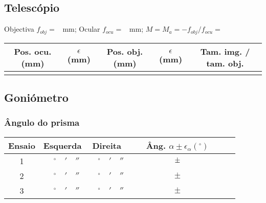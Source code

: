 \documentclass[a4paper,12pt]{article}  %
\begin{document}

\newpage
\subsection{\sf Telescópio}


Objectiva $f_{obj}=$~\underline{\makebox[1cm][r]{~}} mm;
Ocular $f_{ocu}=$~\underline{\makebox[1cm][r]{~}} mm; 
$M=M_a=-f_{obj}/f_{ocu}=$~\underline{\makebox[1cm][r]{~}} 

\begin{center}
	\begin{tabular}{|c|c|c|c|c|}
	\hline
	 Pos. ocu. (mm)   &  
	 $\epsilon$  (mm) & 
	 Pos. obj. (mm) &  
	 $\epsilon$ (mm) &
	 Tam. img. / tam. obj. \\
	 
	\hline \hline
	 &  &  & & \makebox[1cm][r]{} \\ \hline
	\end{tabular}
\end{center}


\vspace{1 cm}

\subsection{\sf Goniómetro}

\subsubsection{\sf Ângulo do prisma}

\begin{center}
	\begin{tabular}{|c|c|c|c||c|}
	\hline
	Ensaio &
	 Esquerda    &  
	 Direita & 
	 Âng. $\alpha\pm\epsilon_{\alpha} (^{\circ})$ \\
	 
	\hline \hline
	 1 & $\quad^{\circ}\quad'\quad''$ & $\quad^{\circ}\quad'\quad''$ & $\makebox[2cm][r]{~}\pm\makebox[2cm][r]{~}$ \\ \cline{1-4}
	 2 & $\quad^{\circ}\quad'\quad''$ & $\quad^{\circ}\quad'\quad''$ & $\quad\pm\quad$ \\ \cline{1-4}
	 3 & $\quad^{\circ}\quad'\quad''$ & $\quad^{\circ}\quad'\quad''$ & $\quad\pm\quad$\\ \hline
	\end{tabular}
\end{center}
\end{document}
